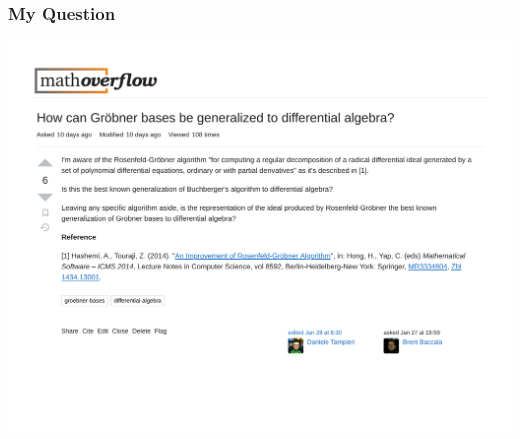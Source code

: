 \documentclass{beamer}
\begin{document}
\begin{frame}
\frametitle{My Question}
\includegraphics[width=\textwidth]{myquestion.pdf}
\end{frame}
\end{document}
